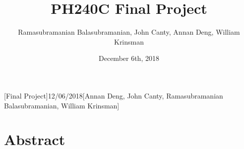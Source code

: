 





\headerfooter{}[Final Project]{}{12/06/2018}[Annan Deng, John Canty, Ramasubramanian Balasubramanian, William Krinsman]

\newcommand{\code}[1]{\mbox{\texttt{#1}}}


\renewcommand{\thesubsection}{ \arabic{subsection}.}
\renewcommand{\thesubsubsection}{(\alph{subsubsection})}




\title{PH240C Final Project \break{} \break {} }
\date{December 6th, 2018}
\author{Ramasubramanian Balasubramanian, John Canty, Annan Deng, William Krinsman}

\maketitle

\section*{Abstract}
\label{sec:abstract}

